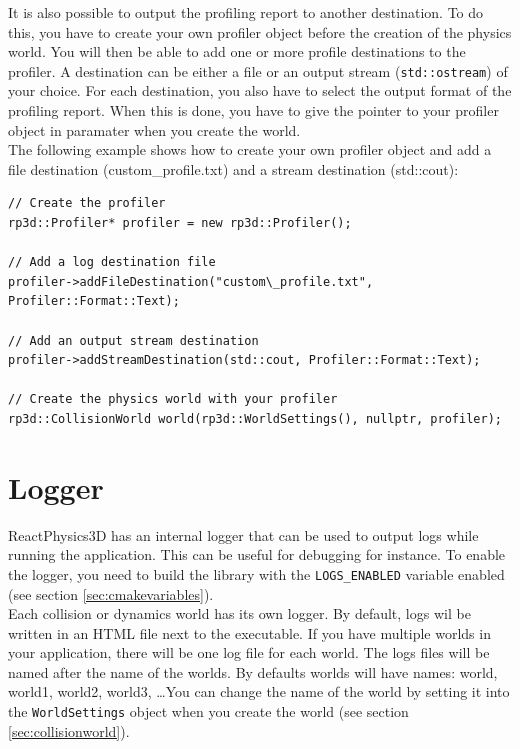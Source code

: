 \documentclass[a4paper,12pt]{article}
\begin{document}
    It is also possible to output the profiling report to another destination. To do this,
    you have to create your own profiler object before the creation of the physics world. You will then be able to add one or more profile destinations
    to the profiler. A destination can be either a file or an output stream (\texttt{std::ostream}) of your choice. For each destination, you also
    have to select the output format of the profiling report. When this is done, you have to give the pointer to your profiler object in paramater
    when you create the world. \\

    The following example shows how to create your own profiler object and add a file destination (custom\_profile.txt) and a stream destination (std::cout): \\

    \begin{lstlisting}
// Create the profiler
rp3d::Profiler* profiler = new rp3d::Profiler();

// Add a log destination file
profiler->addFileDestination("custom\_profile.txt", Profiler::Format::Text);

// Add an output stream destination 
profiler->addStreamDestination(std::cout, Profiler::Format::Text);

// Create the physics world with your profiler
rp3d::CollisionWorld world(rp3d::WorldSettings(), nullptr, profiler);
    \end{lstlisting}

    \section{Logger}
    \label{sec:logger}

    ReactPhysics3D has an internal logger that can be used to output logs while running the application. This can be useful for debugging for instance.
    To enable the logger, you need to build the library with the \texttt{LOGS\_ENABLED} variable enabled (see section \ref{sec:cmakevariables}). \\

    Each collision or dynamics world has its own logger. By default, logs wil be written in an HTML file next to the executable.
    If you have multiple worlds in your application, there will be one log file for each world. The logs files will be named after the
    name of the worlds. By defaults worlds will have names: world, world1, world2, world3, \dots You can change the name of the world by
    setting it into the \texttt{WorldSettings} object when you create the world (see section \ref{sec:collisionworld}). \\
\end{document}
